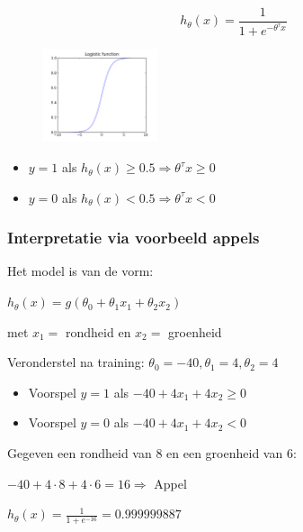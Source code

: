 \documentclass{article}
\begin{document}
\begin{equation}
h_{\theta}(x) = \frac{1}{1 + e^{-\theta^{\tau}x}}
\end{equation}

\begin{figure}[H]
    \centering
    \includegraphics[width=0.3\textwidth]{logistic-regression.png}
    \caption{}
\end{figure}

\begin{itemize}
    \item $y=1$ als $h_{\theta}(x) \geq 0.5 \Rightarrow \theta^{\tau}x \geq 0$
    \item $y=0$ als $h_{\theta}(x) < 0.5 \Rightarrow \theta^{\tau}x < 0$
\end{itemize}

\subsubsection{Interpretatie via voorbeeld appels}

Het model is van de vorm:

\begin{center}
    $h_{\theta}(x) = g(\theta_0 + \theta_1x_1 + \theta_2x_2)$

    met $x_1=$ rondheid en $x_2=$ groenheid
\end{center}

Veronderstel na training: $\theta_0=-40, \theta_1=4, \theta_2=4$

\begin{itemize}
    \item Voorspel $y=1$ als $-40 + 4x_1 + 4x_2 \geq 0$
    \item Voorspel $y=0$ als $-40 + 4x_1 + 4x_2 < 0$
\end{itemize}

Gegeven een rondheid van 8 en een groenheid van 6:

\begin{center}
    $-40 + 4 \cdot 8 + 4 \cdot 6 = 16 \Rightarrow $ Appel

    $h_{\theta}(x) = \frac{1}{1 + e^{-16}} = 0.999999887$
\end{center}
\end{document}
